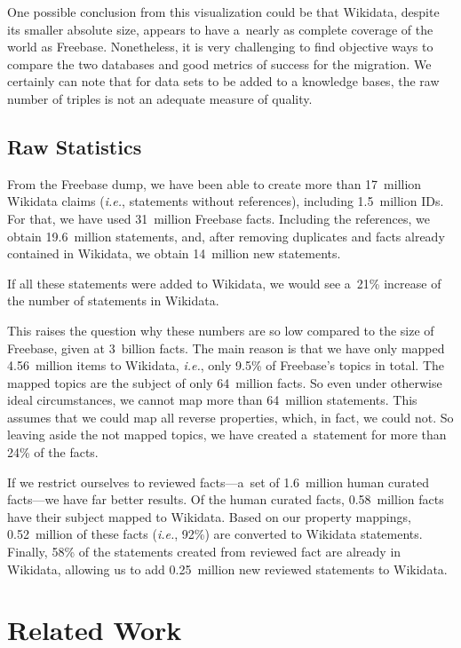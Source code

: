 \documentclass{acm_proc_article-sp}
\begin{document}
One possible conclusion from this visualization could be that Wikidata,
despite its smaller absolute size, appears to have
a~nearly as complete coverage of the world as Freebase.
Nonetheless, it is very challenging to find objective ways to compare the two databases
and good metrics of success for the migration.
We certainly can note that for data sets to be added to a knowledge bases,
the raw number of triples is not an adequate measure of quality.

\subsection{Raw Statistics}

From the Freebase dump, we have been able to create more than 17~million Wikidata claims
(\emph{i.e.}, statements without references), including 1.5~million IDs.
For that, we have used 31~million Freebase facts.
Including the references, we obtain 19.6~million statements, and, after removing duplicates
and facts already contained in Wikidata, we obtain 14~million new statements.

If all these statements were added to Wikidata,
we would see a~21\% increase of the number of statements in Wikidata.

This raises the question why these numbers are so low compared to the size of Freebase, given at
3~billion facts.
The main reason is that we have only mapped 4.56~million items to Wikidata,
\emph{i.e.}, only 9.5\% of Freebase's topics in total.
The mapped topics are the subject of only 64~million facts.
So even under otherwise ideal circumstances, we cannot map more than 64~million statements.
This assumes that we could map all reverse properties, which, in fact, we could not.
So leaving aside the not mapped topics, we have created a~statement for more than 24\% of the facts.

If we restrict ourselves to reviewed facts---a~set of
1.6~million human curated facts---we have far better results.
Of the human curated facts, 0.58~million facts have their subject mapped to Wikidata.
Based on our property mappings, 0.52~million of these facts
(\emph{i.e.}, 92\%) are converted to Wikidata statements.
Finally, 58\% of the statements created from reviewed fact are already in Wikidata,
allowing us to add 0.25~million new reviewed statements to Wikidata.

\section{Related Work}\label{sec:related-work}
\end{document}
